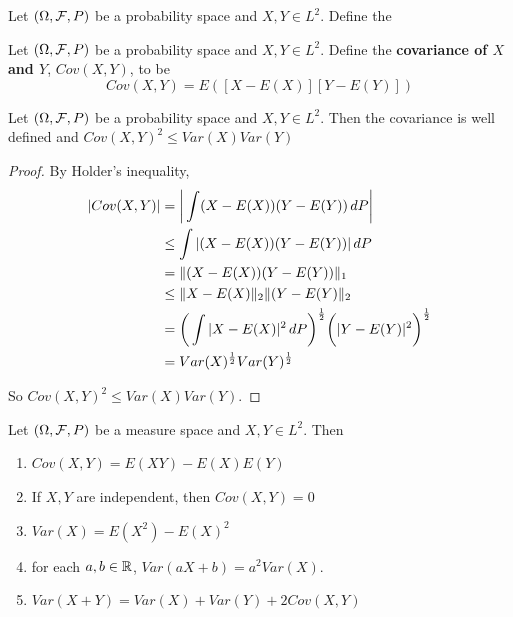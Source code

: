 \documentclass{book}
\begin{document}
	\begin{defn}
		Let $(\Omega, \mathcal{F}, P)$ be a probability space and $X,Y \in L^2$. Define the  
	\end{defn}
	
	
	\begin{defn}
		Let $(\Omega, \mathcal{F}, P)$ be a probability space and $X,Y \in L^2$. Define the \textbf{covariance of $X$ and $Y$}, $Cov(X,Y)$, to be $$Cov(X,Y) = E([X-E(X)][Y-E(Y)])$$
	\end{defn}
	
	\begin{ex}
		Let $(\Omega, \mathcal{F}, P)$ be a probability space and $X,Y \in L^2$. Then the covariance is well defined and $Cov(X,Y) ^2 \leq Var(X)Var(Y)$
		
		\begin{proof}
			By Holder's inequality, 
			\begin{align*}
				| Cov(X,Y) |
				&= \bigg | \int (X-E(X))(Y-E(Y)) \, d P \bigg | \\
				&\leq \int | (X-E(X))(Y-E(Y)) | \, d P \\
				&= \|(X-E(X))(Y-E(Y)) \|_1 \\
				&\leq \|X-E(X) \|_2 \|(Y-E(Y) \|_2  \\
				&= \bigg(\int | X - E(X) |^2 \, d P\bigg)^{\frac{1}{2}} \bigg( | Y - E(Y) |^2 \bigg)^{\frac{1}{2}} \\
				&= Var(X)^{\frac{1}{2}}Var(Y)^{\frac{1}{2}}
			\end{align*}
			
			So $Cov(X,Y) ^2 \leq Var(X)Var(Y)$.
		\end{proof}
		
	\end{ex}
	
	\begin{ex}
		Let $(\Omega, \mathcal{F}, P)$ be a measure space and $X,Y \in L^2$. Then
		\begin{enumerate}
			\item $Cov(X,Y) = E(XY)-E(X)E(Y)$
			\item If $X,Y$ are independent, then $Cov(X,Y) = 0$
			\item $Var(X) = E(X^2) - E(X)^2$
			\item for each $a,b \in \mathbb{R}$, $Var(aX + b) = a^2Var(X)$.
			\item $Var(X+Y) = Var(X) + Var(Y) + 2 Cov(X,Y)$
		\end{enumerate}
	\end{ex}
	
\end{document}
